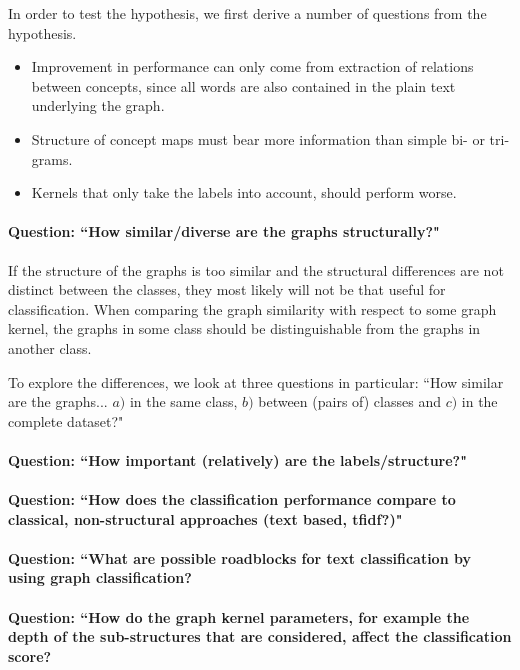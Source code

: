 In order to test the hypothesis, we first derive a number of questions from the hypothesis.

\begin{itemize}
\item{Improvement in performance can only come from extraction of relations between concepts, since all words are also contained in the plain text underlying the graph.}
\item{Structure of concept maps must bear more information than simple bi- or tri-grams.}
\item{Kernels that only take the labels into account, should perform worse.}
\end{itemize}

\paragraph{Question: ``How similar/diverse are the graphs structurally?"}
If the structure of the graphs is too similar and the structural differences are not distinct between the classes, they most likely will not be that useful for classification.
When comparing the graph similarity with respect to some graph kernel, the graphs in some class should be distinguishable from the graphs in another class.

To explore the differences, we look at three questions in particular:
``How similar are the graphs... $a)$ in the same class, $b)$ between (pairs of) classes and $c)$ in the complete dataset?"

\paragraph{Question: ``How important (relatively) are the labels/structure?"}

\paragraph{Question: ``How does the classification performance compare to classical, non-structural approaches (text based, tfidf?)"}

\paragraph{Question: ``What are possible roadblocks for text classification by using graph classification?}

\paragraph{Question: ``How do the graph kernel parameters, for example the depth of the sub-structures that are considered, affect the classification score?}

